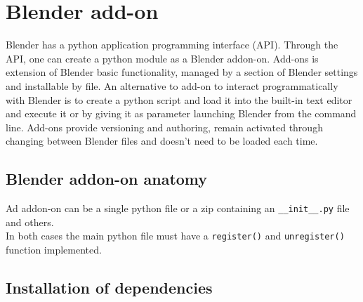 \chapter{Blender add-on}
\label{chap:blender_add_on}

Blender has a python application programming interface (API). Through the API, one can create a python module as a Blender addon-on. Add-ons is extension of Blender basic functionality, managed by a section of Blender settings and installable by file.
An alternative to add-on to interact programmatically with Blender is to create a python script and load it into the built-in text editor and execute it or by giving it as parameter launching Blender from the command line.
Add-ons provide versioning and authoring, remain activated through changing between Blender files and doesn't need to be loaded each time.

\section{Blender addon-on anatomy}
Ad addon-on can be a single python file or a zip containing an \texttt{\_\_init\_\_.py} file and others. \\
In both cases the main python file must have a  \texttt{register()} and \texttt{unregister()} function implemented.

\section{Installation of dependencies}